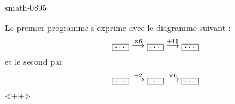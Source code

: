 
\begin{corrige}{smath-0895}

    Le premier programme s'exprime avec le diagramme suivant :
    \begin{equation}
        \fbox{\ldots}\stackrel{\times 6}{\longrightarrow}\fbox{\ldots}\stackrel{+11}{\longrightarrow}\fbox{\ldots}
    \end{equation}
    et le second par
    \begin{equation}
        \fbox{\ldots}\stackrel{+2}{\longrightarrow}\fbox{\ldots}\stackrel{\times 6}{\longrightarrow}\fbox{\ldots}
    \end{equation}
    <++>

\end{corrige}
